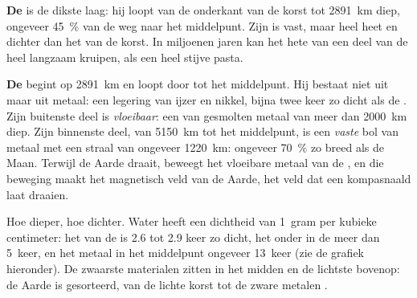 \textbf{De } is de dikste laag: hij loopt van de onderkant van de
korst tot 2891~km diep, ongeveer 45~\% van de weg naar het middelpunt. Zijn
 is vast, maar heel heet en dichter dan het  van de
korst. In miljoenen jaren kan het hete  van een deel van de 
heel langzaam kruipen, als een heel stijve pasta.

\textbf{De } begint op 2891~km en loopt door tot het middelpunt. Hij
bestaat niet uit  maar uit metaal: een legering van ijzer en
nikkel, bijna twee keer zo dicht als de . Zijn buitenste deel is
\emph{vloeibaar}: een  van gesmolten metaal van meer dan 2000~km
diep. Zijn binnenste deel, van 5150~km tot het middelpunt, is een
\emph{vaste} bol van metaal met een straal van ongeveer 1220~km: ongeveer 70~\% zo breed als de Maan. Terwijl de Aarde draait, beweegt het vloeibare metaal van de
, en die beweging maakt het magnetisch veld van de Aarde, het
veld dat een kompasnaald laat draaien.

Hoe dieper, hoe dichter. Water heeft een dichtheid van 1~gram per kubieke
centimeter: het  van de  is 2.6 tot 2.9 keer zo dicht,
het  onder in de  meer dan 5~keer, en het metaal in het
middelpunt ongeveer 13~keer (zie de grafiek hieronder). De zwaarste materialen zitten in het midden en de lichtste bovenop: de Aarde is gesorteerd, van de lichte korst tot de zware metalen .


